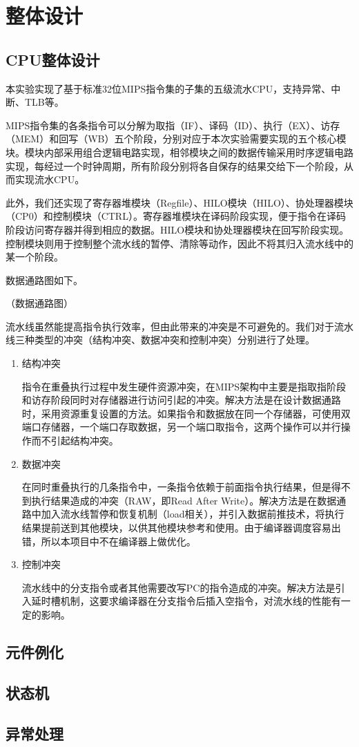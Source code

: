 \section{整体设计}
\subsection{CPU整体设计}
本实验实现了基于标准32位MIPS指令集的子集的五级流水CPU，支持异常、中断、TLB等。

MIPS指令集的各条指令可以分解为取指（IF）、译码（ID）、执行（EX）、访存（MEM）和回写（WB）五个阶段，分别对应于本次实验需要实现的五个核心模块。模块内部采用组合逻辑电路实现，相邻模块之间的数据传输采用时序逻辑电路实现，每经过一个时钟周期，所有阶段分别将各自保存的结果交给下一个阶段，从而实现流水CPU。

此外，我们还实现了寄存器堆模块（Regfile）、HILO模块（HILO）、协处理器模块（CP0）和控制模块（CTRL）。寄存器堆模块在译码阶段实现，便于指令在译码阶段访问寄存器并得到相应的数据。HILO模块和协处理器模块在回写阶段实现。控制模块则用于控制整个流水线的暂停、清除等动作，因此不将其归入流水线中的某一个阶段。

数据通路图如下。

（数据通路图）

流水线虽然能提高指令执行效率，但由此带来的冲突是不可避免的。我们对于流水线三种类型的冲突（结构冲突、数据冲突和控制冲突）分别进行了处理。
\begin{enumerate}
	\item 结构冲突
	
	指令在重叠执行过程中发生硬件资源冲突，在MIPS架构中主要是指取指阶段和访存阶段同时对存储器进行访问引起的冲突。解决方法是在设计数据通路时，采用资源重复设置的方法。如果指令和数据放在同一个存储器，可使用双端口存储器，一个端口存取数据，另一个端口取指令，这两个操作可以并行操作而不引起结构冲突。
	
	\item 数据冲突
	
	在同时重叠执行的几条指令中，一条指令依赖于前面指令执行结果，但是得不到执行结果造成的冲突（RAW，即Read After Write）。解决方法是在数据通路中加入流水线暂停和恢复机制（load相关），并引入数据前推技术，将执行结果提前送到其他模块，以供其他模块参考和使用。由于编译器调度容易出错，所以本项目中不在编译器上做优化。
	
	\item 控制冲突
	
	流水线中的分支指令或者其他需要改写PC的指令造成的冲突。解决方法是引入延时槽机制，这要求编译器在分支指令后插入空指令，对流水线的性能有一定的影响。
	
\end{enumerate}
\subsection{元件例化}
\subsection{状态机}
\subsection{异常处理}